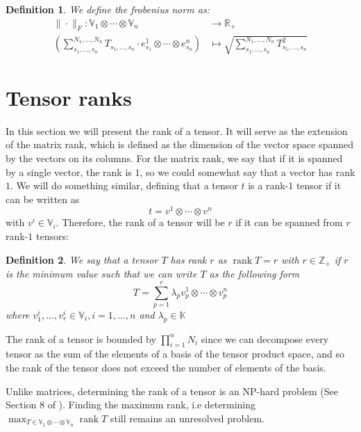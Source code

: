 \documentclass[11pt,a4paper,openright,oneside]{book}
\numberwithin{equation}{section}
\newtheorem{defn0}{Definition}[chapter]
\newenvironment{definition}{ \begin{defn0}}{\end{defn0}}
\DeclareMathOperator{\rank}{rank}
\begin{document}
\begin{definition}
    We define the frobenius norm as:
    $$\begin{align}
        \| \cdot \|_F : \mathbb{V}_1 \otimes \cdots \otimes \mathbb{V}_n & \longrightarrow \mathbb{R}_+ \\
        \left( \sum_{s_1, \dots, s_n}^{N_1, \dots, N_n} T_{s_1, \dots, s_n} \cdot e_{s_1}^1 \otimes \cdots \otimes e_{s_n}^n \right) & \longmapsto 
        \sqrt{\sum_{s_1, \dots, s_n}^{N_1, \dots, N_n} T_{s_1, \dots, s_n}^2}
    \end{align}$$
\end{definition}

\section{Tensor ranks}

In this section we will present the rank of a tensor. It will serve as the extension of the
matrix rank, which is defined as the dimension of the vector space spanned by the vectors
on its columns. For the matrix rank, we say that if it is spanned by a single vector, the rank is $1$, so
we could somewhat say that a vector has rank $1$. We will do something similar, defining
that a tensor $t$ is a rank-$1$ tensor if it can be written as $$t = v^1 \otimes \cdots \otimes v^n$$
with $v^i \in \mathbb{V}_i$. Therefore, the rank of a tensor will be $r$ if it can be spanned from $r$ rank-$1$ tensors:

\begin{definition}
    We say that a tensor $T$ has rank $r$ as $\rank{T} = r$ with 
    $r \in \mathbb{Z}_+$ if $r$ is the minimum value such that we can write $T$ as the following form
    \begin{equation}
        T= \sum_{p=1}^r \lambda_p v_p^1 \otimes \cdots \otimes v_p^n
        \label{eq:rank}
    \end{equation}
    where $v_1^i, \dots, v_r^i \in \mathbb{V}_i, i = 1, \dots, n$ and $\lambda_p \in \mathbb{K}$
\end{definition}

The rank of a tensor is bounded by $\prod_{i=1}^n N_i$ since we can decompose every tensor as the sum
of the elements of a basis of the tensor product space, and so the rank of the tensor does not exceed the number
of elements of the basis.

Unlike matrices, determining the rank of a tensor is an NP-hard problem (See Section 8 of \cite{hillarMostTensorProblems2013}).
Finding the maximum rank, i.e determining $\displaystyle\max_{T \in \mathbb{V}_1 \otimes \cdots \otimes \mathbb{V}_n} \rank{T}$ still remains an unresolved problem.
\cite{christandlTensorRankNot2018}
\end{document}
